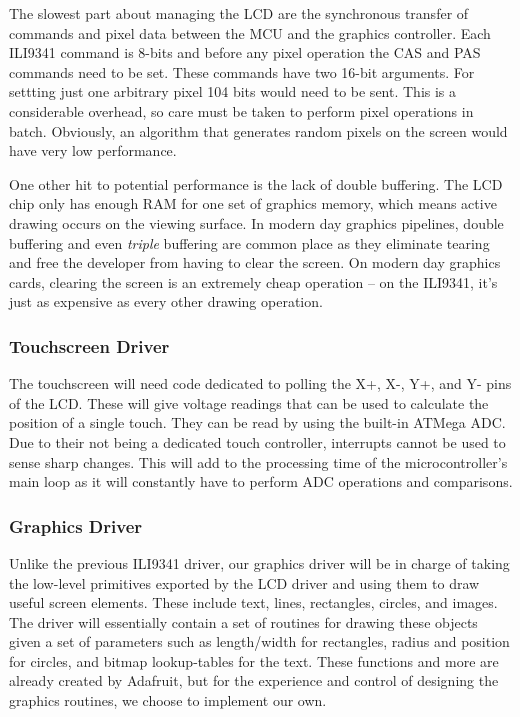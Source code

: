 The slowest part about managing the LCD are the synchronous transfer of
commands and pixel data between the MCU and the graphics controller. Each
ILI9341 command is 8-bits and before any pixel operation the CAS and PAS
commands need to be set. These commands have two 16-bit arguments.
For settting just one arbitrary pixel 104 bits would need to be sent. This is a
considerable overhead, so care must be taken to perform pixel operations in
batch. Obviously, an algorithm that generates random pixels on the screen would have very
low performance.

One other hit to potential performance is the lack of double buffering. The LCD
chip only has enough RAM for one set of graphics memory, which means active
drawing occurs on the viewing surface. In modern day graphics pipelines, double
buffering and even \emph{triple} buffering are common place as they eliminate
tearing and free the developer from having to clear the screen. On modern day
graphics cards, clearing the screen is an extremely cheap operation -- on the
ILI9341, it's just as expensive as every other drawing operation.


\subsubsection{Touchscreen Driver}
The touchscreen will need code dedicated to polling the X+, X-, Y+, and Y- pins
of the LCD. These will give voltage readings that can be used to calculate the
position of a single touch. They can be read by using the built-in ATMega ADC.
Due to their not being a dedicated touch controller,
interrupts cannot be used to sense sharp changes. This will add to the
processing time of the microcontroller's main loop as it will constantly have
to perform ADC operations and comparisons.


\subsubsection{Graphics Driver}
Unlike the previous ILI9341 driver, our graphics driver will be in charge of
taking the low-level primitives exported by the LCD driver and using them to
draw useful screen elements. These include text, lines, rectangles, circles,
and images. The driver will essentially contain a set of routines for drawing
these objects given a set of parameters such as length/width for rectangles,
radius and position for circles, and bitmap lookup-tables for the text. These
functions and more are already created by Adafruit, but for the experience and
control of designing the graphics routines, we choose to implement our own.

